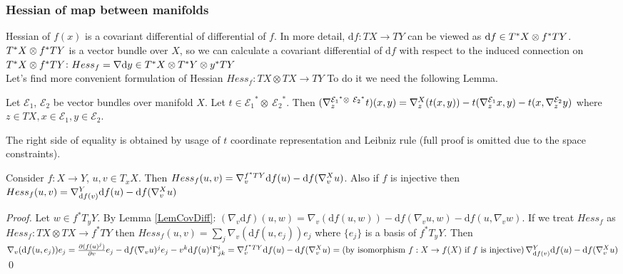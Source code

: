 \documentclass{llncs}
\newcommand{\partderiv}[2]{\frac{\partial #1}{\partial #2}}
\newcommand{\CovariantDerivManif}[2]{\tensor*{\nabla}{^{#1}_{#2}}}
\newcommand{\CovariantDiff}{\nabla}
\newcommand{\CovariantDeriv}[1]{\nabla_{#1}}
\newcommand{\Diff}{\mathrm{d}}
\newcommand{\TangentSpaceArg}[2]{{T_{#2}}{#1}}
\newcommand{\TangentBundle}[1]{T{#1}}
\newcommand{\CotangentBundle}[1]{\tensor*{T}{^{*}}{#1}}
\newcommand {\Preimage}[2]{{#2}^*{#1}}
\newcommand \TArgPreimage[3]{\Preimage{\TangentSpaceArg{#1}{#2}}{#3}}
\newcommand \TPreimage[2]{\Preimage{\TangentBundle{#1}}{#2}}
\newcommand {\DiffSpace}[3]{\CotangentBundle{#1}\otimes \TPreimage{#2}{#3}}
\newcommand {\HessianSpace}[3]{\CotangentBundle{#1}\otimes \CotangentBundle{#2}\otimes \TPreimage{#2}{#3}}
\newcommand {\bigeps}{\mathcal{E}}
\begin{document}
\subsubsection{Hessian of map between manifolds}
Hessian of $f(x)$ is a covariant differential of differential of $f$. In more detail, $\Diff f:TX\to TY$ can be viewed as $\Diff f \in \DiffSpace{X}{Y}{f}$.
$\DiffSpace{X}{Y}{f}$ is a vector bundle over $X$, so we can calculate a covariant differential of $\Diff f$ with respect to the induced connection on $\DiffSpace{X}{Y}{f}$: $Hess_f=\CovariantDiff \Diff y \in \HessianSpace{X}{Y}{y}$
\\
Let's find more convenient formulation of Hessian $Hess_f:\TangentBundle{X}\otimes\TangentBundle{X}\to \TangentBundle{Y}$
To do it we need the following Lemma.
\begin{lemma} \label{LemCovDiff}
Let $\bigeps_1$, $\bigeps_2$ be vector bundles over manifold $X$. 
Let $t \in {\bigeps_1}^* \otimes \ {\bigeps_2}^*$. Then
$(\CovariantDerivManif{{\bigeps_1}^* \otimes \ {\bigeps_2}^*}{z}{t})(x, y) = 
\CovariantDerivManif{X}{z}{(t(x, y))} -
t(\CovariantDerivManif{\bigeps_1}{z}{x}, y) - 
t(x, \CovariantDerivManif{\bigeps_2}{z}{y})$
where $z \in TX, x \in \bigeps_1, y \in \bigeps_2$. 
\end{lemma}
The right side of equality is obtained by usage of $t$ coordinate representation and Leibniz rule (full proof is omitted due to the space constraints).

\begin{lemma} \label{LemHessian}
Consider $f:X\to Y$, $u, v\in T_x X$. Then
$Hess_f(u,v)=\CovariantDerivManif{\TPreimage{Y}{f}} {v} \Diff f(u) - 
							\Diff f( 
							\CovariantDerivManif{X}{v}u
							)$. Also if $f$ is injective then
$Hess_f(u,v)=\CovariantDerivManif{Y}{ \Diff f(v)} \Diff f(u) - 
							\Diff f( 
							\CovariantDerivManif{X}{v}u
							)$
\end{lemma}

\begin{proof}
Let $w\in \TArgPreimage{Y}{y}{f}$. By Lemma \ref{LemCovDiff}: 
$(\CovariantDeriv{v} \Diff f)(u, w) = \CovariantDeriv{v}{(\Diff f(u, w))} - \Diff f(\CovariantDeriv{v}{u}, w) - \Diff f({u}, \CovariantDeriv{v}{w})$.
If we treat $Hess_f$ as $Hess_f:\TangentBundle{X}\otimes\TangentBundle{X}\to \TPreimage{Y}{f}$ 
then $Hess_f(u, v)= \sum_{j} \CovariantDeriv{v}{(\Diff f(u, e_j))} e_j$ where $\{e_j\}$ is a basis of $\TArgPreimage{Y}{y}{f}$. Then
$\CovariantDeriv{v}{(\Diff f(u, e_j))} e_j = \partderiv{(f(u)^j)}{v} e_j - \Diff f(\CovariantDeriv{v}{u})^j e_j - v^k \Diff f(u)^i \tensor*{\Gamma}{^i_j_k}= 
\CovariantDerivManif{\TPreimage{Y}{f}} {v} \Diff f(u) - 
							\Diff f( 
							\CovariantDerivManif{X}{v}u
							) = 
							\textrm{(by isomorphism }f:X\to f(X) \textrm{ if } f \textrm{ is injective)}\,
							\CovariantDerivManif{Y} {\Diff f(v)} \Diff f(u) - 
							\Diff f( 
							\CovariantDerivManif{X}{v}u )$
\qed 
\end{proof}
\end{document}
